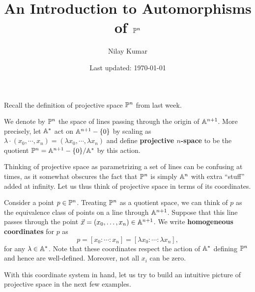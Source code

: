 \documentclass{../../mathnotes}
\title{An Introduction to Automorphisms of $\mathbb{P}^n$}
\author{Nilay Kumar}
\date{Last updated: \today}
\begin{document}
\maketitle


Recall the definition of projective space $\mathbb{P}^n$ from last week.
\begin{defn}
    We denote by $\mathbb{P}^n$ the space of lines passing through the origin of $\mathbb{A}^{n+1}$.
    More precisely, let $\mathbb{A}^*$ act on $\mathbb{A}^{n+1}-\{0\}$ by scaling as $\lambda\cdot(x_0,\cdots,x_n)=(\lambda x_0,\cdots, \lambda x_n)$
    and define \textbf{projective $n$-space} to be the quotient $\mathbb{P}^n=\mathbb{A}^{n+1}-\{0\}/\mathbb{A}^*$ by this action.
\end{defn}

Thinking of projective space as parametrizing a set of lines can be confusing at times, as it somewhat
obscures the fact that $\mathbb{P}^n$ is simply $\mathbb{A}^n$ with extra ``stuff'' added at infinity. Let us thus think
of projective space in terms of its coordinates.

\begin{defn}
    Consider a point $p\in\mathbb{P}^n$. Treating $\mathbb{P}^n$ as a quotient space, we can think of $p$ as the equivalence class
    of points on a line through $\mathbb{A}^{n+1}$. Suppose that this line passes through the point $\vec x=(x_0,\ldots, x_n)\in\mathbb{A}^{n+1}$.
    We write \textbf{homogeneous coordinates} for $p$ as
    \[p=[x_0:\cdots:x_n]=[\lambda x_0:\cdots:\lambda x_n],\]
    for any $\lambda\in\mathbb{A}^*$. Note that these coordinates respect the action of $\mathbb{A}^*$ defining $\mathbb{P}^n$ and hence are well-defined.
    Moreover, not all $x_i$ can be zero.
\end{defn}

With this coordinate system in hand, let us try to build an intuitive picture of projective space
in the next few examples.
\end{document}
